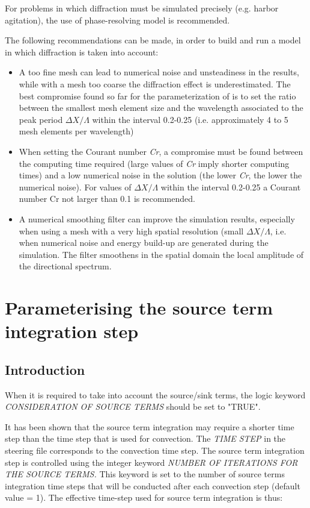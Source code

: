  For problems in which diffraction must be simulated precisely (e.g. harbor agitation), the use of phase-resolving model is recommended.

 The following recommendations can be made, in order to build and run a \tomawac model in which diffraction is taken into account:

\begin{itemize}
\item  A too fine mesh can lead to numerical noise and unsteadiness in the results, while with a mesh too coarse the diffraction effect is underestimated. The best compromise found so far for the parameterization of \tomawac is to set the ratio between the smallest mesh element size and the wavelength associated to the peak period $\Delta X/\Lambda$ within the interval 0.2-0.25 (i.e. approximately 4 to 5 mesh elements per wavelength)

\item  When setting the Courant number \textit{Cr}, a compromise must be found between the computing time required (large values of \textit{Cr} imply shorter computing times) and a low numerical noise in the solution (the lower \textit{Cr}, the lower the numerical noise). For values of  $\Delta X/\Lambda$ within the interval 0.2-0.25 a Courant number Cr not larger than 0.1 is recommended.

\item  A numerical smoothing filter can improve the simulation results, especially when using a mesh with a very high spatial resolution (small $\Delta X/\Lambda$, i.e. when numerical noise and energy build-up are generated during the simulation. The filter smoothens in the spatial domain the local amplitude of the directional spectrum.
\end{itemize}


\section{ Parameterising the source term integration step}


\subsection{ Introduction}

 When it is required to take into account the source/sink terms, the logic keyword \textit{CONSIDERATION OF SOURCE TERMS }should be set to "TRUE".

 It has been shown that the source term integration may require a shorter time step than the time step that is used for convection. The \textit{TIME STEP} in the steering file corresponds to the convection time step. The source term integration step is controlled using the integer keyword \textit{NUMBER OF ITERATIONS FOR THE SOURCE TERMS.} This keyword is set to the number of source terms integration time steps that will be conducted after each convection step (default value = 1). The effective time-step used for source term integration is thus:

